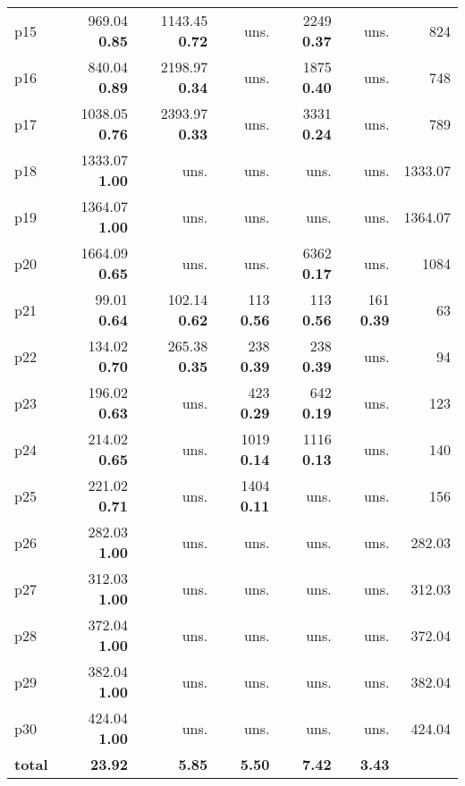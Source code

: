 \begin{tabular}{|l|rrrrr|r|}
p15 & {\footnotesize 969.04} \textbf{0.85} & {\footnotesize 1143.45} \textbf{0.72} & uns. & {\footnotesize 2249} \textbf{0.37} & uns. & 824\\
p16 & {\footnotesize 840.04} \textbf{0.89} & {\footnotesize 2198.97} \textbf{0.34} & uns. & {\footnotesize 1875} \textbf{0.40} & uns. & 748\\
p17 & {\footnotesize 1038.05} \textbf{0.76} & {\footnotesize 2393.97} \textbf{0.33} & uns. & {\footnotesize 3331} \textbf{0.24} & uns. & 789\\
p18 & {\footnotesize 1333.07} \textbf{1.00} & uns. & uns. & uns. & uns. & 1333.07\\
p19 & {\footnotesize 1364.07} \textbf{1.00} & uns. & uns. & uns. & uns. & 1364.07\\
p20 & {\footnotesize 1664.09} \textbf{0.65} & uns. & uns. & {\footnotesize 6362} \textbf{0.17} & uns. & 1084\\
p21 & {\footnotesize 99.01} \textbf{0.64} & {\footnotesize 102.14} \textbf{0.62} & {\footnotesize 113} \textbf{0.56} & {\footnotesize 113} \textbf{0.56} & {\footnotesize 161} \textbf{0.39} & 63\\
p22 & {\footnotesize 134.02} \textbf{0.70} & {\footnotesize 265.38} \textbf{0.35} & {\footnotesize 238} \textbf{0.39} & {\footnotesize 238} \textbf{0.39} & uns. & 94\\
p23 & {\footnotesize 196.02} \textbf{0.63} & uns. & {\footnotesize 423} \textbf{0.29} & {\footnotesize 642} \textbf{0.19} & uns. & 123\\
p24 & {\footnotesize 214.02} \textbf{0.65} & uns. & {\footnotesize 1019} \textbf{0.14} & {\footnotesize 1116} \textbf{0.13} & uns. & 140\\
p25 & {\footnotesize 221.02} \textbf{0.71} & uns. & {\footnotesize 1404} \textbf{0.11} & uns. & uns. & 156\\
p26 & {\footnotesize 282.03} \textbf{1.00} & uns. & uns. & uns. & uns. & 282.03\\
p27 & {\footnotesize 312.03} \textbf{1.00} & uns. & uns. & uns. & uns. & 312.03\\
p28 & {\footnotesize 372.04} \textbf{1.00} & uns. & uns. & uns. & uns. & 372.04\\
p29 & {\footnotesize 382.04} \textbf{1.00} & uns. & uns. & uns. & uns. & 382.04\\
p30 & {\footnotesize 424.04} \textbf{1.00} & uns. & uns. & uns. & uns. & 424.04\\
\hline
\textbf{total} & \textbf{23.92} & \textbf{5.85} & \textbf{5.50} & \textbf{7.42} & \textbf{3.43} & \\
\hline
\end{tabular}

